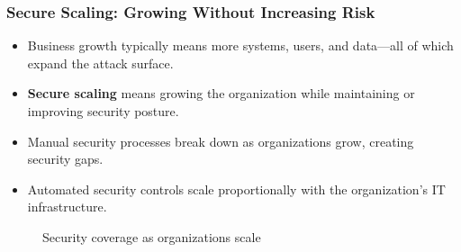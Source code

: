 \documentclass{beamer}
\begin{document}
\begin{frame}
  \frametitle{Secure Scaling: Growing Without Increasing Risk}
  
  \begin{itemize}
    \item Business growth typically means more systems, users, and data—all of which expand the attack surface.
    \item \textbf{Secure scaling} means growing the organization while maintaining or improving security posture.
    \item Manual security processes break down as organizations grow, creating security gaps.
    \item Automated security controls scale proportionally with the organization's IT infrastructure.
  \end{itemize}
  
  \begin{figure}
    \centering
    \caption{Security coverage as organizations scale}
  \end{figure}
\end{frame}
\end{document}

